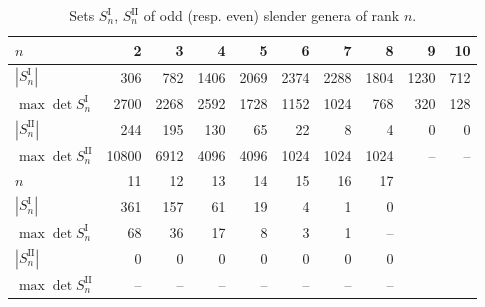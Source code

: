 \documentclass[a4paper]{amsart}
\theoremstyle{definition}
\theoremstyle{plain}
\newcommand{\I}{\mathrm{I}}
\newcommand{\II}{\mathrm{II}}
\begin{document}
\begin{table}
\footnotesize
\caption{Sets \(S^\I_n\), \(S^\II_n\) of odd (resp. even) slender genera of rank \(n\).}
\label{tab:summary.slender}
\begin{tabular}{lrrrrrrrrr}
    \toprule
    \(n\)         & 2     & 3    & 4    & 5    & 6    & 7    & 8    & 9    & 10  \\
    \midrule 
    \(|S_n^\I|\)  &  306   & 782  & 1406 & 2069 & 2374 & 2288 & 1804 & 1230 & 712 \\
    \(\max \det S_n^\I\)   & 2700 & 2268 & 2592 & 1728 & 1152 & 1024 & 768  & 320  & 128 \\
    \(|S_n^\II|\) &  244   & 195  & 130  & 65   & 22   & 8    & 4    & 0    & 0     \\
    \(\max \det S_n^\II\) & 10800& 6912 & 4096 & 4096 & 1024 & 1024 & 1024 & --   & -- \\
    \midrule 
    \(n\)       & 11  & 12  & 13 & 14 & 15 & 16 & 17 \\
    \midrule 
    \(|S_n^\I|\)  & 361 & 157 & 61 & 19 & 4  & 1  & 0  \\
    \(\max \det S_n^\I\)  & 68  & 36  & 17 & 8  & 3  & 1  & -- \\
    \(|S_n^\II|\) & 0   & 0   & 0  & 0  & 0  & 0  & 0  \\
    \(\max \det S_n^\II\) & --  & --  & -- & -- & -- & -- & -- \\
    \bottomrule
\end{tabular}
\end{table} 
\end{document}
